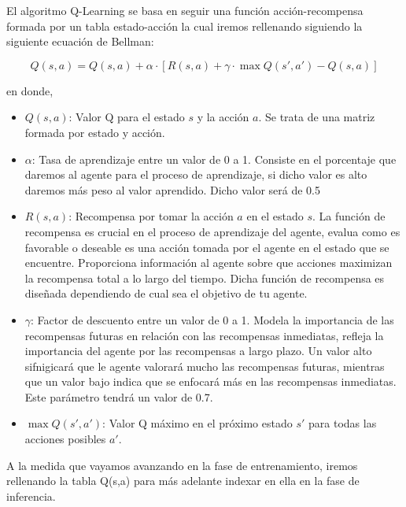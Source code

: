   El algoritmo Q-Learning  se basa en seguir una función acción-recompensa formada por un tabla estado-acción la cual iremos rellenando siguiendo la siguiente ecuación
  de Bellman\cite{Bellman}:
  
  \begin{equation}
    Q(s, a) = Q(s, a) + \alpha \cdot [R(s, a) + \gamma \cdot \max Q(s', a') - Q(s, a)]
  \end{equation}

  en donde, 

  \begin{itemize}
    \item \textbf{$Q(s, a)$}: Valor Q para el estado $s$ y la acción $a$. Se trata de una matriz formada por estado y acción.
    \item \textbf{$\alpha$}: Tasa de aprendizaje entre un valor de 0 a 1. Consiste en el porcentaje que daremos al agente para el proceso de aprendizaje, 
    si dicho valor es alto daremos más peso al valor aprendido. Dicho valor será de 0.5 
    \item \textbf{$R(s, a)$}: Recompensa por tomar la acción $a$ en el estado $s$. La función de recompensa es crucial en el proceso de aprendizaje del agente, evalua como es favorable o deseable
    es una acción tomada por el agente en el estado que se encuentre. Proporciona información al agente sobre que acciones maximizan la recompensa total a lo largo del tiempo. Dicha función
    de recompensa es diseñada dependiendo de cual sea el objetivo de tu agente. 
    \item \textbf{$\gamma$}: Factor de descuento entre un valor de 0 a 1. Modela la importancia de las recompensas futuras en relación con las recompensas inmediatas, refleja la importancia del agente
    por las recompensas a largo plazo. Un valor alto sifnigicará que le agente valorará mucho las recompensas futuras, mientras que un valor bajo indica que se enfocará más en las recompensas
    inmediatas. Este parámetro tendrá un valor de 0.7.
    \item \textbf{$\max Q(s', a')$}: Valor Q máximo en el próximo estado $s'$ para todas las acciones posibles $a'$.
\end{itemize}

A la medida que vayamos avanzando en la fase de entrenamiento, iremos rellenando la tabla Q(s,a) para más adelante indexar en ella en la fase de inferencia.

